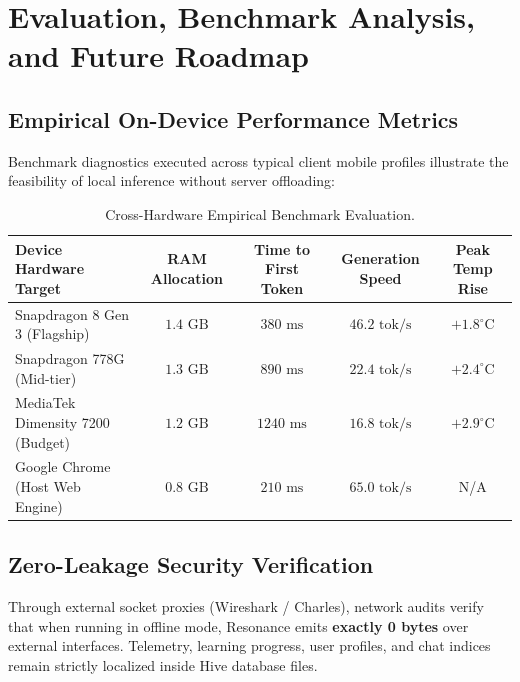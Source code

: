 \documentclass[10.5pt,a4paper]{article}
\begin{document}
\clearpage

\section{Evaluation, Benchmark Analysis, and Future Roadmap}

\subsection{Empirical On-Device Performance Metrics}
Benchmark diagnostics executed across typical client mobile profiles illustrate the feasibility of local inference without server offloading:

\begin{table}[h!]
\centering
\footnotesize
\begin{tabularx}{\textwidth}{lcccc}
\toprule
\textbf{Device Hardware Target} & \textbf{RAM Allocation} & \textbf{Time to First Token} & \textbf{Generation Speed} & \textbf{Peak Temp Rise} \\
\midrule
Snapdragon 8 Gen 3 (Flagship) & $1.4\text{ GB}$ & $380\text{ ms}$ & $46.2\text{ tok/s}$ & $+1.8^\circ\text{C}$ \\
Snapdragon 778G (Mid-tier) & $1.3\text{ GB}$ & $890\text{ ms}$ & $22.4\text{ tok/s}$ & $+2.4^\circ\text{C}$ \\
MediaTek Dimensity 7200 (Budget) & $1.2\text{ GB}$ & $1240\text{ ms}$ & $16.8\text{ tok/s}$ & $+2.9^\circ\text{C}$ \\
Google Chrome (Host Web Engine) & $0.8\text{ GB}$ & $210\text{ ms}$ & $65.0\text{ tok/s}$ & N/A \\
\bottomrule
\end{tabularx}
\caption{Cross-Hardware Empirical Benchmark Evaluation.}
\label{tab:benchmarks}
\end{table}

\vspace{-0.2cm}

\subsection{Zero-Leakage Security Verification}
Through external socket proxies (Wireshark / Charles), network audits verify that when running in offline mode, Resonance emits \textbf{exactly 0 bytes} over external interfaces. Telemetry, learning progress, user profiles, and chat indices remain strictly localized inside Hive database files.
\end{document}
